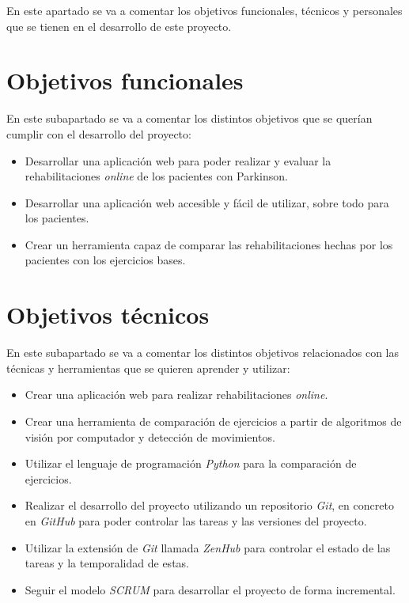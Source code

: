 
En este apartado se va a comentar los objetivos funcionales, técnicos y personales que se tienen en el desarrollo de este proyecto.

\section{Objetivos funcionales}
En este subapartado se va a comentar los distintos objetivos que se querían cumplir con el desarrollo del proyecto:
\begin{itemize}
	\item Desarrollar una aplicación web para poder realizar y evaluar la rehabilitaciones \textit{online} de los pacientes con Parkinson.
	\item Desarrollar una aplicación web accesible y fácil de utilizar, sobre todo para los pacientes.
	\item Crear un herramienta capaz de comparar las rehabilitaciones hechas por los pacientes con los ejercicios bases.
\end{itemize}

\section{Objetivos técnicos}
En este subapartado se va a comentar los distintos objetivos relacionados con las técnicas y herramientas que se quieren aprender y utilizar:
\begin{itemize}
	\item Crear una aplicación web para realizar rehabilitaciones \textit{online}.
	\item Crear una herramienta de comparación de ejercicios a partir de algoritmos de visión por computador y detección de movimientos.
	\item Utilizar el lenguaje de programación \textit{Python} para la comparación de ejercicios.
	\item Realizar el desarrollo del proyecto utilizando un repositorio \textit{Git}, en concreto en \textit{GitHub} para poder controlar las tareas y las versiones del proyecto.
	\item Utilizar la extensión de \textit{Git} llamada \textit{ZenHub} para controlar el estado de las tareas y la temporalidad de estas.
	\item Seguir el modelo \textit{SCRUM} para desarrollar el proyecto de forma incremental.
\end{itemize}

